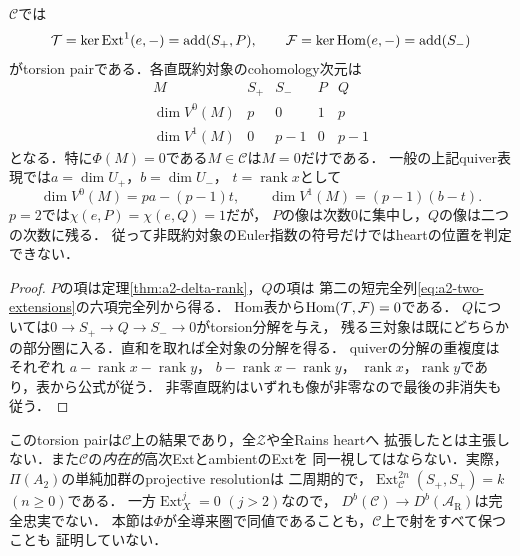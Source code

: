\begin{corollary}
\label{cor:a2-torsion-pair}
$\mathcal C$では
\[
\mathcal T=\ker\operatorname{Ext}^1(e,-)=\operatorname{add}(S_+,P),\qquad
\mathcal F=\ker\operatorname{Hom}(e,-)=\operatorname{add}(S_-)
\]
がtorsion pairである．各直既約対象のcohomology次元は
\[
\begin{array}{c|rrrr}
M&S_+&S_-&P&Q\\\hline
\dim V^0(M)&p&0&1&p\\
\dim V^1(M)&0&p-1&0&p-1
\end{array}
\]
となる．特に$\Phi(M)=0$である$M\in\mathcal C$は$M=0$だけである．
一般の上記quiver表現では$a=\dim U_+$，$b=\dim U_-$，
$t=\operatorname{rank}x$として
\[
\dim V^0(M)=pa-(p-1)t,\qquad
\dim V^1(M)=(p-1)(b-t).
\]
$p=2$では$\chi(e,P)=\chi(e,Q)=1$だが，
$P$の像は次数0に集中し，$Q$の像は二つの次数に残る．
従って非既約対象のEuler指数の符号だけではheartの位置を判定できない．
\end{corollary}
\begin{proof}
$P$の項は定理\ref{thm:a2-delta-rank}，$Q$の項は
第二の短完全列\eqref{eq:a2-two-extensions}の六項完全列から得る．
Hom表から$\operatorname{Hom}(\mathcal T,\mathcal F)=0$である．
$Q$については$0\to S_+\to Q\to S_-\to0$がtorsion分解を与え，
残る三対象は既にどちらかの部分圏に入る．直和を取れば全対象の分解を得る．
quiverの分解の重複度はそれぞれ
$a-\operatorname{rank}x-\operatorname{rank}y$，
$b-\operatorname{rank}x-\operatorname{rank}y$，
$\operatorname{rank}x$，$\operatorname{rank}y$であり，表から公式が従う．
非零直既約はいずれも像が非零なので最後の非消失も従う．
\end{proof}

\begin{remark}[局所分類と導来比較の区別]
このtorsion pairは$\mathcal C$上の結果であり，全$\mathcal Z$や全Rains heartへ
拡張したとは主張しない．また$\mathcal C$の\emph{内在的}高次ExtとambientのExtを
同一視してはならない．実際，$\Pi(A_2)$の単純加群のprojective resolutionは
二周期的で，$\operatorname{Ext}_{\mathcal C}^{2n}(S_+,S_+)=k$ $(n\ge0)$である．
一方$\operatorname{Ext}_X^j=0$ $(j>2)$なので，
$D^b(\mathcal C)\to D^b(\mathcal A_{\mathrm R})$は完全忠実でない．
本節は$\Phi$が全導来圏で同値であることも，$\mathcal C$上で射をすべて保つことも
証明していない．
\end{remark}

